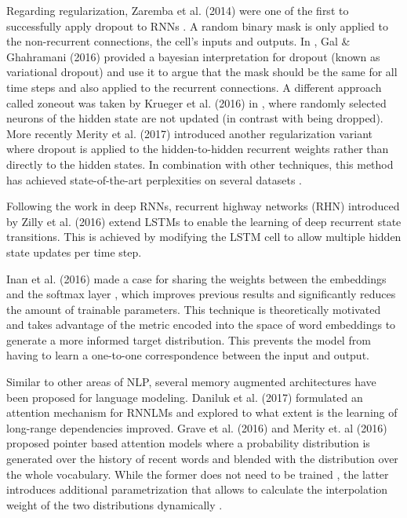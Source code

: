 Regarding regularization, Zaremba et al. (2014) were one of the first to successfully apply dropout to RNNs \cite{zaremba2014recurrent}. A random binary mask is only applied to the non-recurrent connections, the cell's inputs and outputs. In \cite{gal2016theoretically}, Gal \& Ghahramani (2016) provided a bayesian interpretation for dropout (known as variational dropout) and use it to argue that the mask should be the same for all time steps and also applied to the recurrent connections. A different approach called zoneout was taken by Krueger et al. (2016) in \cite{krueger2016zoneout}, where randomly selected neurons of the hidden state are not updated (in contrast with being dropped). More recently Merity et al. (2017) introduced another regularization variant where dropout is applied to the hidden-to-hidden recurrent weights rather than directly to the hidden states. In combination with other techniques, this method has achieved state-of-the-art perplexities on several datasets \cite{merity2017regularizing}.

Following the work in deep RNNs, recurrent highway networks (RHN) \cite{zilly2016recurrent} introduced by Zilly et al. (2016) extend LSTMs to enable the learning of deep recurrent state transitions. This is achieved by modifying the LSTM cell to allow multiple hidden state updates per time step.

Inan et al. (2016) made a case for sharing the weights between the embeddings and the softmax layer \cite{inan2016tying}, which improves previous results and significantly reduces the amount of trainable parameters. This technique is theoretically motivated and takes advantage of the metric encoded into the space of word embeddings to generate a more informed target distribution. This prevents the model from having to learn a one-to-one correspondence between the input and output.

Similar to other areas of NLP, several memory augmented architectures have been proposed for language modeling. Daniluk et al. (2017) formulated an attention mechanism for RNNLMs \cite{daniluk2017frustratingly} and explored to what extent is the learning of long-range dependencies improved. Grave et al. (2016) and Merity et. al (2016) proposed pointer based attention models where a probability distribution is generated over the history of recent words and blended with the distribution over the whole vocabulary. While the former does not need to be trained \cite{grave2016improving}, the latter introduces additional parametrization that allows to calculate the interpolation weight of the two distributions dynamically \cite{merity2016pointer}.

